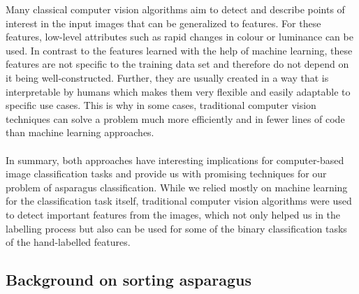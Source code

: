 Many classical computer vision algorithms aim to detect and describe points of interest in the input images that can be generalized to features. For these features, low-level attributes such as rapid changes in colour or luminance can be used. In contrast to the features learned with the help of machine learning, these features are not specific to the training data set and therefore do not depend on it being well-constructed. Further, they are usually created in a way that is interpretable by humans which makes them very flexible and easily adaptable to specific use cases. This is why in some cases, traditional computer vision techniques can solve a  problem much more efficiently and in fewer lines of code than machine learning approaches. \\
\\
In summary, both approaches have interesting implications for computer-based image classification tasks and provide us with promising techniques for our problem of asparagus classification. While we relied mostly on machine learning for the classification task itself, traditional computer vision algorithms were used to detect important features from the images, which not only helped us in the labelling process but also can be used for some of the binary classification tasks of the hand-labelled features.


\subsection{Background on sorting asparagus}

